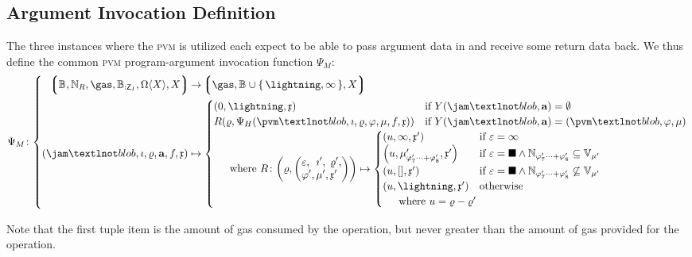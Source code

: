 \subsection{Argument Invocation Definition}

The three instances where the \textsc{pvm} is utilized each expect to be able to pass argument data in and receive some return data back. We thus define the common \textsc{pvm} program-argument invocation function $\Psi_M$:
\begin{equation}
  \Psi_M\colon \abracegroup{
    \tuple{
      \blob, \pvmreg, \gas, \blob[:\Cpvminitinputsize], \contextmutator{X}, X
    } &\to \tuple{\gas, \blob \cup \set{\panic, \oog}, X}\\
    \tup{\jam¬blob, \imath, \gascounter, \mathbf{a}, f, \context} &\mapsto \begin{cases}
      \tup{0, \panic, \context} &\when Y(\jam¬blob, \mathbf{a}) = \none\\
      R(\gascounter, \Psi_H(\pvm¬blob, \imath, \gascounter, \registers, \mem, f, \context)) &\when Y(\jam¬blob, \mathbf{a}) = \tup{\pvm¬blob, \registers, \mem}\\
      \multicolumn{2}{l}{
        \quad \where R \colon \tup{\gascounter, \tup{\begin{alignedat}{5}
          &\varepsilon,\, &&\imath',\, &&\gascounter',\\
          &\registers',\, &&\mem',\, &&\context'
        \end{alignedat}
        }} \mapsto \begin{cases}
          \tup{u, \oog, \context'} &\when \varepsilon = \oog \\
          \tup{u, \memory'_{\registers'_{7}\dots+\registers'_{8}}, \context'} &\when \varepsilon = \halt \wedge \Nrange{\registers'_{7}}{\registers'_{8}} \subseteq \readable{\mem'} \\
          \tup{u, \sq{}, \context'} &\when \varepsilon = \halt \wedge \Nrange{\registers'_{7}}{\registers'_{8}} \not\subseteq \readable{\mem'} \\
          \tup{u, \panic, \context'} &\otherwise \\
          \multicolumn{2}{l}{\quad \where u = \gascounter - \gascounter'}
        \end{cases}
      }\!\!\!\!\!\!\!\!
    \end{cases}
  }
\end{equation}

Note that the first tuple item is the amount of gas consumed by the operation, but never greater than the amount of gas provided for the operation.

